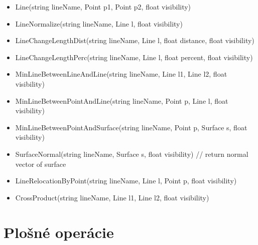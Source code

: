 \begin{itemize}
		\item Line(string lineName, Point p1, Point p2, float visibility) 

		\item LineNormalize(string lineName, Line l, float visibility)

		\item LineChangeLengthDist(string lineName, Line l, float distance, float visibility)
		
		\item LineChangeLengthPerc(string lineName, Line l, float percent, float visibility) 



		
		\item MinLineBetweenLineAndLine(string lineName, Line l1, Line l2, float visibility)
		
		\item MinLineBetweenPointAndLine(string lineName, Point p, Line l, float visibility)
		
		\item MinLineBetweenPointAndSurface(string lineName, Point p, Surface s, float visibility)


		\item SurfaceNormal(string lineName, Surface s, float visibility) // return normal vector of surface



		\item LineRelocationByPoint(string lineName, Line l, Point p, float visibility)


		\item CrossProduct(string lineName, Line l1, Line l2, float visibility)

\end{itemize}

\section{Plošné operácie}

